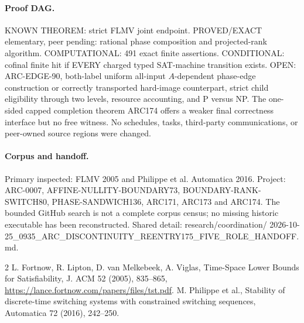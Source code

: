 \documentclass[11pt]{article}
\begin{document}
\paragraph{Proof DAG.}
KNOWN THEOREM: strict FLMV joint endpoint.
PROVED/EXACT elementary, peer pending: rational
phase composition and projected-rank algorithm.
COMPUTATIONAL: 491 exact finite assertions.
CONDITIONAL: cofinal finite hit if EVERY charged
typed SAT-machine transition exists.
OPEN: ARC-EDGE-90, both-label uniform all-input
\(A\)-dependent phase-edge construction or correctly
transported hard-image counterpart, strict child eligibility
through two levels, resource accounting, and P versus NP.
The one-sided capped completion theorem ARC174 offers
a weaker final correctness interface but no free witness.
No schedules, tasks, third-party communications, or
peer-owned source regions were changed.
\paragraph{Corpus and handoff.}
Primary inspected: FLMV 2005 and Philippe et al.
Automatica 2016. Project: ARC-0007,
AFFINE-NULLITY-BOUNDARY73, BOUNDARY-RANK-SWITCH80,
PHASE-SANDWICH136, ARC171, ARC173 and ARC174.
The bounded GitHub search is not a complete corpus census;
no missing historic executable has been reconstructed.
Shared detail: research/coordination/
2026-10-25\_0935\_ARC\_DISCONTINUITY\_REENTRY175\_FIVE\_ROLE\_HANDOFF.md.
\begin{thebibliography}{2}
 L. Fortnow, R. Lipton,
D. van Melkebeek, A. Viglas,
Time-Space Lower Bounds for Satisfiability,
J. ACM 52 (2005), 835--865,
\url{https://lance.fortnow.com/papers/files/tst.pdf}.
 M. Philippe et al.,
Stability of discrete-time switching systems
with constrained switching sequences,
Automatica 72 (2016), 242--250.
\end{thebibliography}
\end{document}

